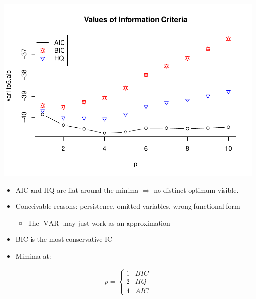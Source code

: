 \documentclass[12pt,a4paper]{article}
\newcommand{\VAR}{\operatorname{VAR}} %
\begin{document}
\includegraphics{solution_exercise_5_files/figure-latex/unnamed-chunk-8-1.pdf}

\begin{itemize}
\tightlist
\item
  AIC and HQ are flat around the minima \(\Rightarrow\) no distinct
  optimum visible.
\item
  Conceivable reasons: persistence, omitted variables, wrong functional
  form

  \begin{itemize}
  \tightlist
  \item
    The \(\VAR\) may just work as an approximation
  \end{itemize}
\item
  BIC is the most conservative IC
\item
  Mimima at:
\end{itemize}

\begin{align*}
p = 
  \begin{cases}
  1 & BIC \\
  2 & HQ \\
  4 & AIC
  \end{cases}
\end{align*}
\end{document}

